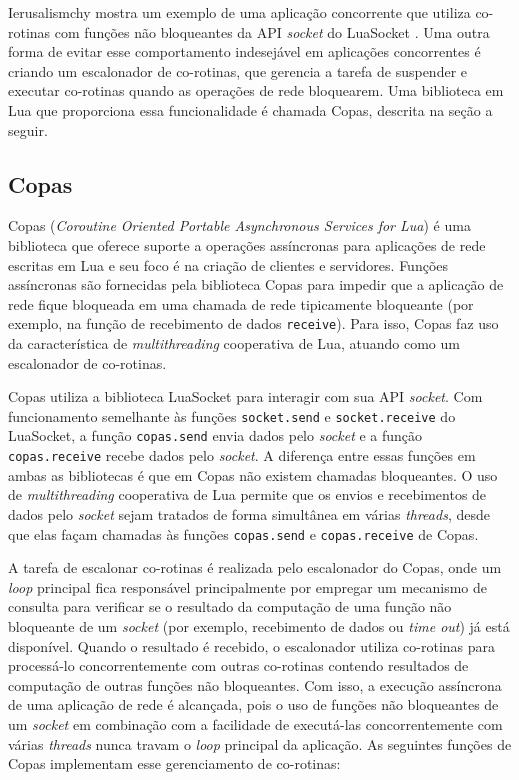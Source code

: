 Ierusalismchy \cite{Ierusalimschy2016PiL} mostra um exemplo de uma aplicação concorrente que utiliza co-rotinas com funções não bloqueantes da API {\em socket} do LuaSocket \cite{Nehab2007}. Uma outra forma de evitar esse comportamento indesejável em aplicações concorrentes é criando um escalonador de co-rotinas, que gerencia a tarefa de suspender e executar co-rotinas quando as operações de rede bloquearem. Uma biblioteca em Lua que proporciona essa funcionalidade é chamada Copas, descrita na seção a seguir.

\subsection{Copas}
\label{subsec:copas}

Copas ({\em Coroutine Oriented Portable Asynchronous Services for Lua}) \cite{Copas} é uma biblioteca que oferece suporte a operações assíncronas para aplicações de rede escritas em Lua e seu foco é na criação de clientes e servidores. Funções assíncronas são fornecidas pela biblioteca Copas para impedir que a aplicação de rede fique bloqueada em uma chamada de rede tipicamente bloqueante (por exemplo, na função de recebimento de dados \verb|receive|). Para isso, Copas faz uso da característica de {\em multithreading} cooperativa de Lua, atuando como um escalonador de co-rotinas.

Copas utiliza a biblioteca LuaSocket \cite{Nehab2007} para interagir com sua API {\em socket}. Com funcionamento semelhante às funções \verb|socket.send| e \verb|socket.receive| do LuaSocket, a função \verb|copas.send| envia dados pelo {\em socket} e a função \verb|copas.receive| recebe dados pelo {\em socket}. A diferença entre essas funções em ambas as bibliotecas é que em Copas não existem chamadas bloqueantes. O uso de {\em multithreading} cooperativa de Lua permite que os envios e recebimentos de dados pelo {\em socket} sejam tratados de forma simultânea em várias {\em threads}, desde que elas façam chamadas às funções \verb|copas.send| e \verb|copas.receive| de Copas.

A tarefa de escalonar co-rotinas é realizada pelo escalonador do Copas, onde um {\em loop} principal fica responsável principalmente por empregar um mecanismo de consulta para verificar se o resultado da computação de uma função não bloqueante de um {\em socket} (por exemplo, recebimento de dados ou {\em time out}) já está disponível. Quando o resultado é recebido, o escalonador utiliza co-rotinas para processá-lo concorrentemente com outras co-rotinas contendo resultados de computação de outras funções não bloqueantes. Com isso, a execução assíncrona de uma aplicação de rede é alcançada, pois o uso de funções não bloqueantes de um {\em socket} em combinação com a facilidade de executá-las concorrentemente com várias {\em threads} nunca travam o {\em loop} principal da aplicação. As seguintes funções de Copas implementam esse gerenciamento de co-rotinas:

